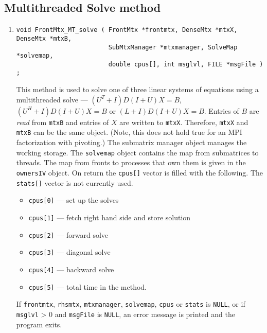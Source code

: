 \subsection{Multithreaded Solve method}
\label{subsection:FrontMtx:proto:solve-multithreaded}
\par
\begin{enumerate}
\item
\begin{verbatim}
void FrontMtx_MT_solve ( FrontMtx *frontmtx, DenseMtx *mtxX, DenseMtx *mtxB,
                         SubMtxManager *mtxmanager, SolveMap *solvemap,
                         double cpus[], int msglvl, FILE *msgFile ) ;
\end{verbatim}
This method is used to solve one of three linear systems of equations
using a multithreaded solve
---
$(U^T + I)D(I + U) X = B$,
$(U^H + I)D(I + U) X = B$ or
$(L + I)D(I + U) X = B$.
Entries of $B$ are {\it read} from {\tt mtxB} and
entries of $X$ are written to {\tt mtxX}.
Therefore, {\tt mtxX} and {\tt mtxB} can be the same object.
(Note, this does not hold true for an MPI factorization with pivoting.)
The submatrix manager object manages the working storage.
The {\tt solvemap} object contains the map from submatrices to
threads.
The map from fronts to processes that own them is given in the {\tt
ownersIV} object.
On return the {\tt cpus[]} vector is filled with the following.
The {\tt stats[]} vector is not currently used.
\begin{itemize}
\item
{\tt cpus[0]} --- set up the solves
\item
{\tt cpus[1]} --- fetch right hand side and store solution
\item
{\tt cpus[2]} --- forward solve
\item
{\tt cpus[3]} --- diagonal solve
\item
{\tt cpus[4]} --- backward solve
\item
{\tt cpus[5]} --- total time in the method.
\end{itemize}
\par {}
If {\tt frontmtx}, {\tt rhsmtx}, {\tt mtxmanager},
{\tt solvemap}, {\tt cpus} or {\tt stats} is {\tt NULL},
or if {\tt msglvl} > 0 and {\tt msgFile} is {\tt NULL},
an error message is printed and the program exits.
\end{enumerate}
\par
